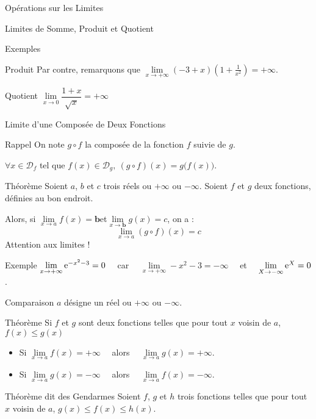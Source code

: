 \documentclass{cours}
\begin{document}
\begin{Gpartie}{Opérations sur les Limites}
\begin{Spartie}{Limites de Somme, Produit et Quotient}
\begin{SSpartie}{Exemples}
\begin{SSSpartie}{Produit}
                    Par contre, remarquons que $\lim\limits_{x\to+\infty}\left(-3+x\right)\left(1+\frac{1}{x^2}\right)=+\infty$.
                \end{SSSpartie}
                \begin{SSSpartie}{Quotient} 
                    $\lim\limits_{x\to0}\dfrac{1+x}{\sqrt{x}}=+\infty$
                \end{SSSpartie}
            \end{SSpartie}
        \end{Spartie}
        \pagebreak
        \begin{Spartie}{Limite d'une Composée de Deux Fonctions} 
            \begin{SSpartie}{Rappel} 
                On note $g\circ f$ la composée de la fonction $f$ suivie de $g$.

                $\forall x\in\mathcal{D}_f$ tel que $f(x)\in\mathcal{D}_g,~(g\circ f)(x)=g\big(f(x)\big)$.
            \end{SSpartie}
            \begin{SSpartie}{Théorème} 
                Soient $a$, $b$ et $c$ trois réels ou $+\infty$ ou $-\infty$. Soient $f$ et $g$ deux fonctions, définies au bon endroit. 
                
                Alors, si $\lim\limits_{x\to a}f(x)=\boldsymbol{b}$\quad et\quad$\lim\limits_{x\to\boldsymbol{b}}g(x)=c$, on a : \[\lim\limits_{x\to a}(g\circ f)(x)=c\]
                Attention aux limites !
            \end{SSpartie}
            \begin{SSpartie}{Exemple} 
                $\lim\limits_{x\to+\infty}\mathrm{e}^{-x^2-3}=0\quad$ car $\quad\lim\limits_{x\to+\infty}-x^2-3=-\infty\quad$ et $\quad\lim\limits_{X\to-\infty}\mathrm{e}^X=0$.
            \end{SSpartie}
        \end{Spartie}
        \begin{Spartie}{Comparaison} 
            $a$ désigne un réel ou $+\infty$ ou $-\infty$.
            \begin{SSpartie}{Théorème} 
                Si $f$ et $g$ sont deux fonctions telles que pour tout $x$ voisin de $a$, $f(x)\leq g(x)$
                \begin{itemize}
                    \item Si $\lim\limits_{x\to a}f(x)=+\infty\quad$ alors $\quad\lim\limits_{x\to a}g(x)=+\infty$.
                    \item Si $\lim\limits_{x\to a}g(x)=-\infty\quad$ alors $\quad\lim\limits_{x\to a}f(x)=-\infty$.
                \end{itemize}
            \end{SSpartie}
            \begin{SSpartie}{Théorème dit \og des Gendarmes \fg{}} 
                Soient $f$, $g$ et $h$ trois fonctions telles que pour tout $x$ voisin de $a$, $g(x)\leq f(x)\leq h(x)$.


\end{SSpartie}
\end{Spartie}
\end{Gpartie}
\end{document}
